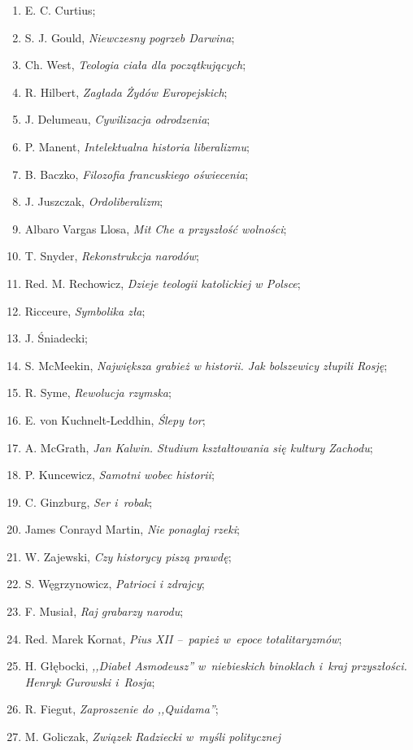 \documentclass[a4paper,11pt]{article}
\begin{document}
\begin{enumerate}
\item E. C. Curtius;
\item S. J. Gould, \emph{Niewczesny pogrzeb Darwina};
\item Ch. West, \emph{Teologia ciała dla początkujących};
\item R. Hilbert, \emph{Zagłada Żydów Europejskich};
\item J. Delumeau, \emph{Cywilizacja odrodzenia};
\item P. Manent, \emph{Intelektualna historia liberalizmu};
\item B. Baczko, \emph{Filozofia francuskiego oświecenia};
\item J. Juszczak, \emph{Ordoliberalizm};
\item Albaro Vargas Llosa, \emph{Mit Che a przyszłość wolności};
\item T. Snyder, \emph{Rekonstrukcja narodów};
\item Red. M. Rechowicz, \emph{Dzieje teologii katolickiej w Polsce};
\item Ricceure, \emph{Symbolika zła};
\item J. Śniadecki;
\item S. McMeekin, \emph{Największa grabież w historii. Jak bolszewicy
    złupili Rosję};
\item R. Syme, \emph{Rewolucja rzymska};
\item E. von Kuchnelt-Leddhin, \emph{Ślepy tor};
\item A. McGrath, \emph{Jan Kalwin. Studium kształtowania się kultury
    Zachodu};
\item P. Kuncewicz, \emph{Samotni wobec historii};
\item C. Ginzburg, \emph{Ser i~robak};
\item James Conrayd Martin, \emph{Nie ponaglaj rzeki};
\item W. Zajewski, \emph{Czy historycy piszą prawdę};
\item S. Węgrzynowicz, \emph{Patrioci i zdrajcy};
\item F. Musiał, \emph{Raj grabarzy narodu};
\item Red. Marek Kornat, \emph{Pius XII --~papież w~epoce
    totalitaryzmów};
\item H. Głębocki, \emph{,,Diabeł Asmodeusz'' w~niebieskich binoklach
    i~kraj przyszłości. Henryk Gurowski i~Rosja};
\item R. Fiegut, \emph{Zaproszenie do ,,Quidama''};
\item M. Goliczak, \emph{Związek Radziecki w~myśli politycznej
}
\end{enumerate}
\end{document}
